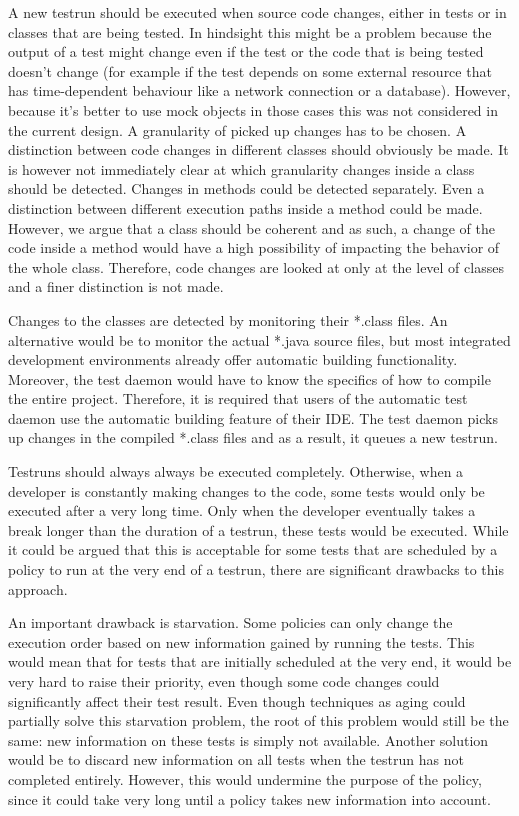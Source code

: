 \documentclass[i2]{oss}
\begin{document}
A new testrun should be executed when source code changes, either in tests or in classes that are being tested. 
In hindsight this might be a problem because the output of a test might
change even if the test or the code that is being tested doesn't change
(for example if the test depends on some external resource that has 
time-dependent behaviour like a network connection or a database).
However, because it's better to use mock objects in those cases this was
not considered in the current design.
A granularity of picked up changes has to be chosen.
A distinction between code changes in different classes should obviously be made.
It is however not immediately clear at which granularity changes inside a class should be detected.
Changes in methods could be detected separately.
Even a distinction between different execution paths inside a method could be made.
However, we argue that a class should be coherent and as such, a change of the code inside a method would have a high possibility of impacting the behavior of the whole class.
Therefore, code changes are looked at only at the level of classes and a finer distinction is not made.

Changes to the classes are detected by monitoring their *.class files.
An alternative would be to monitor the actual *.java source files, but most integrated development environments already offer automatic building functionality.
Moreover, the test daemon would have to know the specifics of how to compile the entire project. 
Therefore, it is required that users of the automatic test daemon use the automatic building feature of their IDE.
The test daemon picks up changes in the compiled *.class files and as a result, it queues a new testrun.

Testruns should always always be executed completely.
Otherwise, when a developer is constantly making changes to the code, some tests would only be executed after a very long time.
Only when the developer eventually takes a break longer than the duration of a testrun, these tests would be executed.
While it could be argued that this is acceptable for some tests that are scheduled by a policy to run at the very end of a testrun, there are significant drawbacks to this approach.

An important drawback is starvation. Some policies can only change the execution order based on new information gained by running the tests.
This would mean that for tests that are initially scheduled at the very end, it would be very hard to raise their priority, even though some code changes could significantly affect their test result.
Even though techniques as aging could partially solve this starvation problem, the root of this problem would still be the same: new information on these tests is simply not available. Another solution would be to discard new information on all tests when the testrun has not completed entirely. However, this would undermine the purpose of the policy, since it could take very long until a policy takes new information into account.
\end{document}

